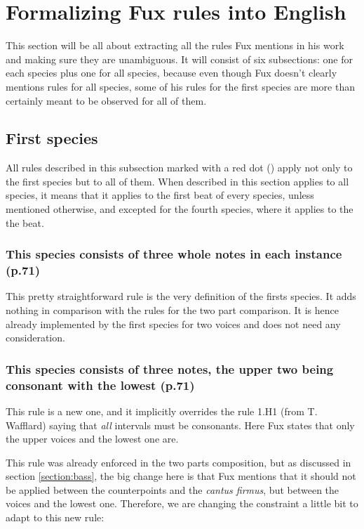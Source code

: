 \chapter{Formalizing Fux rules into English}
This section will be all about extracting all the rules Fux mentions in his work and making sure they are unambiguous.
It will consist of six subsections: one for each species plus one for all species, because even though Fux doesn't clearly mentions rules for all species, some of his rules for the first species are more than certainly meant to be observed for all of them. 

\section{First species}
All rules described in this subsection marked with a red dot (\reddot) apply not only to the first species but to all of them. When described in this section applies to all species, it means that it applies to the first beat of every species, unless mentioned otherwise, and excepted for the fourth species, where it applies to the the beat.

\subsection{This species consists of three whole notes in each instance (p.71)}
This pretty straightforward rule is the very definition of the firsts species. It adds nothing in comparison with the rules for the two part comparison. It is hence already implemented by the first species for two voices and does not need any consideration. 

\subsection{\reddot This species consists of three notes, the upper two being consonant with the lowest (p.71)} \label{rule:consonant}
This rule is a new one, and it implicitly overrides the rule 1.H1 (from T. Wafflard) saying that \textit{all} intervals must be consonants. Here Fux states that only the upper voices and the lowest one are.

This rule was already enforced in the two parts composition, but as discussed in section \ref{section:bass}, the big change here is that Fux mentions that it should not be applied between the counterpoints and the \textit{cantus firmus}, but between the voices and the lowest one. Therefore, we are changing the constraint %
a little bit to adapt to this new rule:


